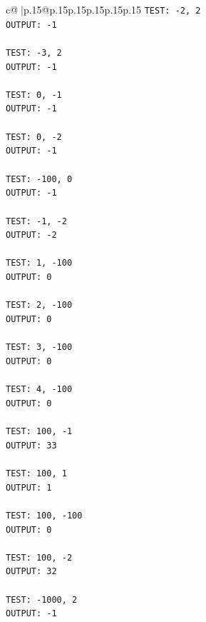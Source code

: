 \documentclass{article}
\begin{document}
{\begin{supertabular}{c@{$\;$}|p{.15\linewidth}@{}p{.15\linewidth}p{.15\linewidth}p{.15\linewidth}p{.15\linewidth}p{.15\linewidth}}
{{{\texttt{TEST: {-}2, 2} \\
\texttt{OUTPUT: {-}1} \\
\\ 
\texttt{TEST: {-}3, 2} \\
\texttt{OUTPUT: {-}1} \\
\\ 
\texttt{TEST: 0, {-}1} \\
\texttt{OUTPUT: {-}1} \\
\\ 
\texttt{TEST: 0, {-}2} \\
\texttt{OUTPUT: {-}1} \\
\\ 
\texttt{TEST: {-}100, 0} \\
\texttt{OUTPUT: {-}1} \\
\\ 
\texttt{TEST: {-}1, {-}2} \\
\texttt{OUTPUT: {-}2} \\
\\ 
\texttt{TEST: 1, {-}100} \\
\texttt{OUTPUT: 0} \\
\\ 
\texttt{TEST: 2, {-}100} \\
\texttt{OUTPUT: 0} \\
\\ 
\texttt{TEST: 3, {-}100} \\
\texttt{OUTPUT: 0} \\
\\ 
\texttt{TEST: 4, {-}100} \\
\texttt{OUTPUT: 0} \\
\\ 
\texttt{TEST: 100, {-}1} \\
\texttt{OUTPUT: 33} \\
\\ 
\texttt{TEST: 100, 1} \\
\texttt{OUTPUT: 1} \\
\\ 
\texttt{TEST: 100, {-}100} \\
\texttt{OUTPUT: 0} \\
\\ 
\texttt{TEST: 100, {-}2} \\
\texttt{OUTPUT: 32} \\
\\ 
\texttt{TEST: {-}1000, 2} \\
\texttt{OUTPUT: {-}1} \\
\\ 
}}}
\end{supertabular}}
\end{document}
